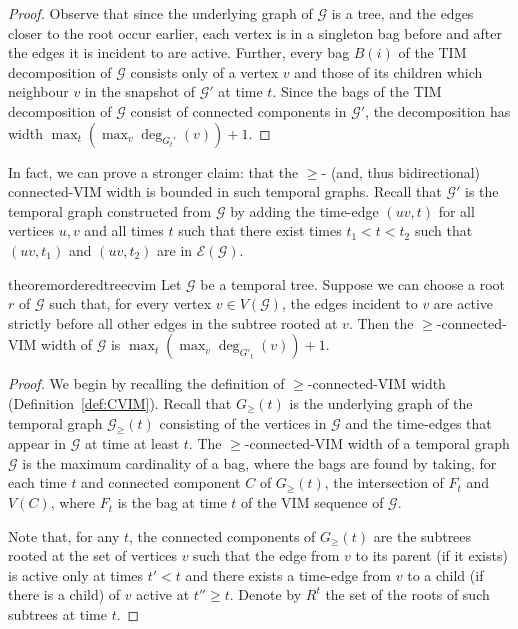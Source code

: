 \documentclass[a4paper,UKenglish,cleveref, autoref, thm-restate]{lipics-v2021} %
\begin{document}
\begin{toappendix}
\begin{proof}
    Observe that since the underlying graph of $\mathcal{G}$ is a tree, and the edges closer to the root occur earlier, each vertex is in a singleton bag before and after the edges it is incident to are active. Further, every bag $B(i)$ of the TIM decomposition of $\mathcal{G}$ consists only of a vertex $v$ and those of its children which neighbour $v$ in the snapshot of $\mathcal{G}'$ at time $t$.
    Since the bags of the TIM decomposition of $\mathcal{G}$ consist of connected components in $\mathcal{G}'$, the decomposition has width $\max_t(\max_v\deg_{G_t'}(v))+1$.
\end{proof}
In fact, we can prove a stronger claim: that the $\geq$- (and, thus bidirectional) connected-VIM width is bounded in such temporal graphs. Recall that $\mathcal{G}'$ is the temporal graph constructed from $\mathcal{G}$ by adding the time-edge $(uv,t)$ for all vertices $u,v$ and all times $t$ such that there exist times $t_1<t<t_2$ such that $(uv,t_1)$ and $(uv,t_2)$ are in $\mathcal{E}(\mathcal{G})$.

\begin{restatable}{theorem}{orderedtreecvim}\label{thm:ordered-tree-low-cvim}
    Let $\mathcal{G}$ be a temporal tree. Suppose we can choose a root $r$ of $\mathcal{G}$ such that, for every vertex $v\in V(\mathcal{G})$, the edges incident to $v$ are active strictly before all other edges in the subtree rooted at $v$. Then the $\geq$-connected-VIM width of $\mathcal{G}$ is $\max_t(\max_v\deg_{G'_t}(v))+1$. 
\end{restatable}
\begin{proof}
    We begin by recalling the definition of $\geq$-connected-VIM width (Definition~\ref{def:CVIM}). Recall that $G_{\geq}(t)$ is the underlying graph of the temporal graph $\mathcal{G}_{\geq}(t)$ consisting of the vertices in $\mathcal{G}$ and the time-edges that appear in $\mathcal{G}$ at time at least $t$. The $\geq$-connected-VIM width of a temporal graph $\mathcal{G}$ is the maximum cardinality of a bag, where the bags are found by taking, for each time $t$ and connected component $C$ of $G_{\geq}(t)$, the intersection of $F_t$ and $V(C)$, where $F_t$ is the bag at time $t$ of the VIM sequence of $\mathcal{G}$.

    Note that, for any $t$, the connected components of $G_{\geq}(t)$ are the subtrees rooted at the set of vertices $v$ such that the edge from $v$ to its parent (if it exists) is active only at times $t'<t$ and there exists a time-edge from $v$ to a child (if there is a child) of $v$ active at $t''\geq t$. Denote by $R^t$ the set of the roots of such subtrees at time $t$.
    

\end{proof}
\end{toappendix}
\end{document}
